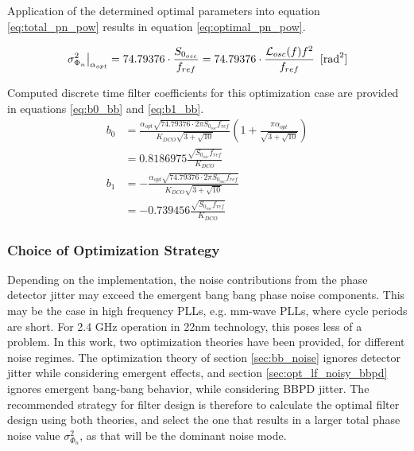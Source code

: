 Application of the determined optimal parameters into equation \ref{eq:total_pn_pow} results in equation \ref{eq:optimal_pn_pow}. 

	\begin{equation}\label{eq:optimal_pn_pow}
		\left.\sigma_{\Phi_{n}}^2\right|_{\alpha_{opt}} = 74.79376\cdot\frac{S_{0_{osc}}}{f_{ref}} = 74.79376\cdot \frac{\mathcal{L}_{osc}(f)f^2}{f_{ref}} \hspace{0.5em} [\textnormal{rad}^2]
	\end{equation}





	Computed discrete time filter coefficients for this optimization case are provided in equations \ref{eq:b0_bb} and \ref{eq:b1_bb}.
	\begin{align}
		b_0 &= \frac{\alpha_{opt}\sqrt{74.79376\cdot2\pi S_{0_{osc}} f_{ref}}}{K_{DCO}\sqrt{3+\sqrt{10}}}\left(1+\frac{\pi\alpha_{opt}}{\sqrt{3+\sqrt{10}}}\right)\label{eq:b0_bb}\\
		&= 0.8186975 \frac{\sqrt{S_{0_{osc}} f_{ref}}}{K_{DCO}}\\
		b_1 &= -\frac{\alpha_{opt}\sqrt{74.79376\cdot2\pi S_{0_{osc}} f_{ref}}}{K_{DCO}\sqrt{3+\sqrt{10}}} \label{eq:b1_bb}\\
		&=-0.739456 \frac{\sqrt{S_{0_{osc}} f_{ref}}}{K_{DCO}}
	\end{align}

	\subsubsection{Choice of Optimization Strategy}
	Depending on the implementation, the noise contributions from the phase detector jitter may exceed the emergent bang bang phase noise components. This may be the case in high frequency PLLs, e.g. mm-wave PLLs, where cycle periods are short. For 2.4 GHz operation in 22nm technology, this poses less of a problem. In this work, two optimization theories have been provided, for different noise regimes. The optimization theory of section \ref{sec:bb_noise} ignores detector jitter while considering emergent effects, and section \ref{sec:opt_lf_noisy_bbpd} ignores emergent bang-bang behavior, while considering BBPD jitter. The recommended strategy for filter design is therefore to calculate the optimal filter design using both theories, and select the one that results in a larger total phase noise value $\sigma_{\Phi_{n}}^2$, as that will be the dominant noise mode. 

